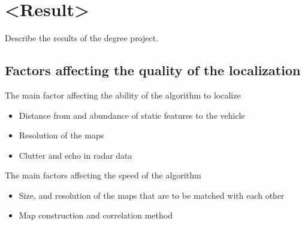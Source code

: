 \chapter{<Result>}
Describe the results of the degree project.

\section{Factors affecting the quality of the localization}
The main factor affecting the ability of the algorithm to localize
\begin{itemize}
    \item Distance from and abundance of static features to the vehicle
    \item Resolution of the maps
    \item Clutter and echo in radar data
\end{itemize}
The main factors affecting the speed of the algorithm 
\begin{itemize}
    \item Size, and resolution of the maps that are to be matched with each other
    \item Map construction and correlation method
\end{itemize}

